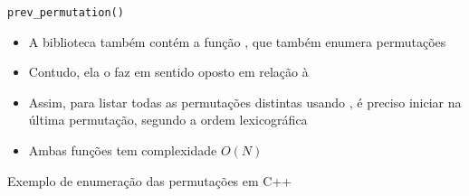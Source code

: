 \begin{frame}[fragile]{\tt prev\_permutation()}

    \begin{itemize}
        \item A biblioteca  também contém a função , que também 
            enumera permutações

        \item Contudo, ela o faz em sentido oposto em relação à 

        \item Assim, para listar todas as permutações distintas usando , é preciso 
            iniciar na última permutação, segundo a ordem lexicográfica

        \item Ambas funções tem complexidade $O(N)$
    \end{itemize}

\end{frame}

\begin{frame}[fragile]{Exemplo de enumeração das permutações em C++}
\end{frame}
